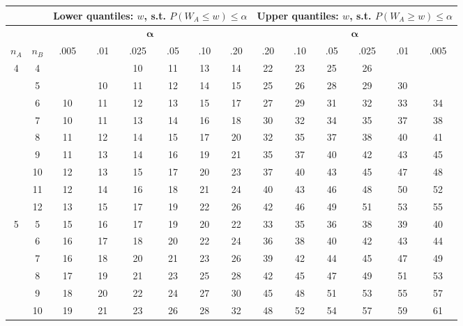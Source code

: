 \documentclass{article}
\begin{document}
\begin{center}

  \begin{tabular}[t]{|c|c|*{6}{c}|*{6}{c}|}
  \multicolumn{2}{c}{}
  &
  \multicolumn{6}{c}{\textbf{Lower quantiles}: $w$, s.t. $P(W_A\le w)\le\alpha$}
  &
  \multicolumn{6}{c}{\textbf{Upper quantiles}: $w$, s.t. $P(W_A\ge w)\le\alpha$}
  \\
  \hline
  &
  &
  \multicolumn{6}{|c}{$\mathbf{\alpha}$}
  &
  \multicolumn{6}{|c|}{$\mathbf{\alpha}$} \\
  $n_A$ & $n_B$
          &.005 &.01  &.025 & .05 & .10 & .20 & .20 & .10 & .05 &.025 & .01 &.005 \\
  \hline
   4 &  4 &     &     &  10 &  11 &  13 &  14 &  22 &  23 &  25 &  26 &     &     \\
     &  5 &     &  10 &  11 &  12 &  14 &  15 &  25 &  26 &  28 &  29 &  30 &     \\
     &  6 &  10 &  11 &  12 &  13 &  15 &  17 &  27 &  29 &  31 &  32 &  33 &  34 \\
     &  7 &  10 &  11 &  13 &  14 &  16 &  18 &  30 &  32 &  34 &  35 &  37 &  38 \\
     &  8 &  11 &  12 &  14 &  15 &  17 &  20 &  32 &  35 &  37 &  38 &  40 &  41 \\
     &  9 &  11 &  13 &  14 &  16 &  19 &  21 &  35 &  37 &  40 &  42 &  43 &  45 \\
     & 10 &  12 &  13 &  15 &  17 &  20 &  23 &  37 &  40 &  43 &  45 &  47 &  48 \\
     & 11 &  12 &  14 &  16 &  18 &  21 &  24 &  40 &  43 &  46 &  48 &  50 &  52 \\
     & 12 &  13 &  15 &  17 &  19 &  22 &  26 &  42 &  46 &  49 &  51 &  53 &  55 \\
  \hline
   5 &  5 &  15 &  16 &  17 &  19 &  20 &  22 &  33 &  35 &  36 &  38 &  39 &  40 \\  %
     &  6 &  16 &  17 &  18 &  20 &  22 &  24 &  36 &  38 &  40 &  42 &  43 &  44 \\
     &  7 &  16 &  18 &  20 &  21 &  23 &  26 &  39 &  42 &  44 &  45 &  47 &  49 \\
     &  8 &  17 &  19 &  21 &  23 &  25 &  28 &  42 &  45 &  47 &  49 &  51 &  53 \\
     &  9 &  18 &  20 &  22 &  24 &  27 &  30 &  45 &  48 &  51 &  53 &  55 &  57 \\
     & 10 &  19 &  21 &  23 &  26 &  28 &  32 &  48 &  52 &  54 &  57 &  59 &  61 \\

\end{tabular}
\end{center}
\end{document}
